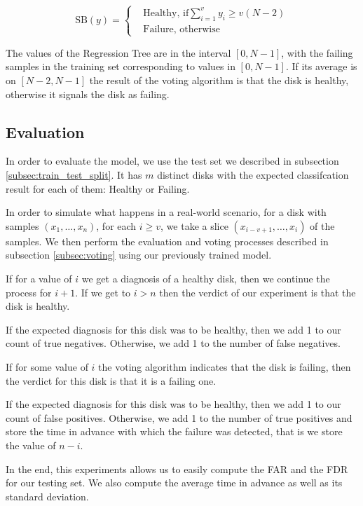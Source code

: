 \begin{equation}\label{eq:score_based_voting_regression}
  \text{SB}(y) = 
    \begin{cases}
        & \text{Healthy, if} \sum_{i=1}^v y_i \geq v(N-2) \\
        & \text{Failure, otherwise} 
  \end{cases}
\end{equation}

The values of the Regression Tree are in the interval $[0,N-1]$, with the failing samples in the training set corresponding to values in $[0,N-1]$.
If its average is on $[N-2,N-1]$ the result of the voting algorithm is that the disk is healthy, otherwise it signals the disk as failing.

\subsection{Evaluation}

In order to evaluate the model, we use the test set we described in subsection \ref{subsec:train_test_split}.
It has $m$ distinct disks with the expected classifcation result for each of them: Healthy or Failing.

In order to simulate what happens in a real-world scenario, for a disk with samples $(x_1,\dots,x_n)$, for each $i \geq v$, we take a slice $(x_{i-v+1}, \dots, x_i)$ of the samples.
We then perform the evaluation and voting processes described in subsection \ref{subsec:voting} using our previously trained model.

If for a value of $i$ we get a diagnosis of a healthy disk, then we continue the process for $i+1$.
If we get to $i > n$ then the verdict of our experiment is that the disk is healthy.

If the expected diagnosis for this disk was to be healthy, then we add 1 to our count of true negatives.
Otherwise, we add 1 to the number of false negatives.

If for some value of $i$ the voting algorithm indicates that the disk is failing, then the verdict for this disk is that it is a failing one.

If the expected diagnosis for this disk was to be healthy, then we add 1 to our count of false positives.
Otherwise, we add 1 to the number of true positives and store the time in advance with which the failure was detected, that is we store the value of $n-i$.

In the end, this experiments allows us to easily compute the FAR and the FDR for our testing set.
We also compute the average time in advance as well as its standard deviation.


